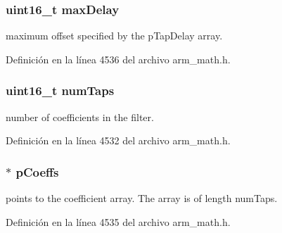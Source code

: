 \subsubsection[{\texorpdfstring{max\+Delay}{maxDelay}}]{\setlength{\rightskip}{0pt plus 5cm}uint16\+\_\+t max\+Delay}\hypertarget{structarm__fir__sparse__instance__q7_ab25f4ee7550e6d92acff77ada283733f}{}\label{structarm__fir__sparse__instance__q7_ab25f4ee7550e6d92acff77ada283733f}
maximum offset specified by the p\+Tap\+Delay array. 

Definición en la línea 4536 del archivo arm\+\_\+math.\+h.

\subsubsection[{\texorpdfstring{num\+Taps}{numTaps}}]{\setlength{\rightskip}{0pt plus 5cm}uint16\+\_\+t num\+Taps}\hypertarget{structarm__fir__sparse__instance__q7_a751941891e47f522a7f5375fe8990aac}{}\label{structarm__fir__sparse__instance__q7_a751941891e47f522a7f5375fe8990aac}
number of coefficients in the filter. 

Definición en la línea 4532 del archivo arm\+\_\+math.\+h.

\subsubsection[{\texorpdfstring{p\+Coeffs}{pCoeffs}}]{$\ast$ p\+Coeffs}\hypertarget{structarm__fir__sparse__instance__q7_a54407554b4fe7bbbb43924e4eea45e7f}{}\label{structarm__fir__sparse__instance__q7_a54407554b4fe7bbbb43924e4eea45e7f}
points to the coefficient array. The array is of length num\+Taps. 

Definición en la línea 4535 del archivo arm\+\_\+math.\+h.

